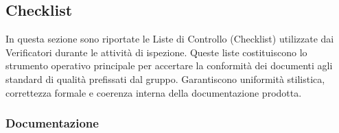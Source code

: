 \documentclass[a4paper,12pt]{article}
\begin{document}
        \subsection{Checklist}

        In questa sezione sono riportate le Liste di Controllo (Checklist) utilizzate dai Verificatori durante le attività di ispezione. Queste liste costituiscono lo strumento operativo principale per accertare la conformità dei documenti agli standard di qualità prefissati dal gruppo. 
        Garantiscono uniformità stilistica, correttezza formale e coerenza interna della documentazione prodotta.

            \subsubsection{Documentazione}
\end{document}
